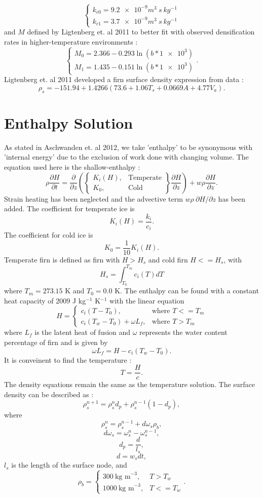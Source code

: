 \documentclass{article}%
\begin{document}
  $$
  \begin{cases}
    k_{c0} = \SI{9.2e-9} m^3\ s\ kg^{-1} \\
    k_{c1} = \SI{3.7e-9} m^3\ s\ kg^{-1}  
  \end{cases}
  $$
and $M$ defined by Ligtenberg et. al 2011 to better fit with observed densification rates in higher-temperature environments :
  $$
  \begin{cases}
    M_0 = 2.366 - 0.293\ln(b*\SI{1e3})\\
    M_1 = 1.435 - 0.151\ln(b*\SI{1e3})
  \end{cases}.
  $$
Ligtenberg et. al 2011 developed a firn surface density expression from data :
  $$ \rho_s = -151.94 + 1.4266(73.6 + 1.06T_s + 0.0669A + 4.77V_a).$$


\section{Enthalpy Solution}

As stated in Aschwanden et. al 2012, we take 'enthalpy' to be synonymous with 'internal energy' due to the exclusion of work done with changing volume.  The equation used here is the shallow-enthalpy :
	$$
  \rho \frac{\partial H}{\partial t} = \frac{\partial}{\partial z} 
    \left( 
      \begin{Bmatrix}
        K_i(H), &\text{Temperate}\\
        K_0, &\text{Cold}
      \end{Bmatrix}
      \frac{\partial H}{\partial z} 
    \right) + w \rho \frac{\partial H}{\partial z}.
  $$
Strain heating has been neglected and the advective term $w \rho\ \partial H / \partial z$ has been added.  The coefficient for temperate ice is 
  $$K_i(H) = \frac{k_i}{c_i}.$$
The coefficient for cold ice is
  $$K_0 = \frac{1}{10}K_i(H).$$
Temperate firn is defined as firn with $H > H_s$ and cold firn $H <= H_s$, with
  $$H_s = \int_{T_0}^{T_m}{c_i(T)}dT$$ 
where $T_m = 273.15$ K and $T_0 = 0.0$ K.  The enthalpy can be found with a constant heat capacity of $2009$ J kg$^{-1}$ K$^{-1}$ with the linear equation
  $$
  H = 
  \begin{cases}
    c_i(T - T_0), &\text{where } T <= T_m\\
    c_i(T_w - T_0) + \omega L_f,  &\text{where } T > T_m
  \end{cases}
  $$
where $L_f$ is the latent heat of fusion and $\omega$ represents the water content percentage of firn and is given by
  $$\omega L_f = H - c_i(T_w - T_0).$$
It is conveinent to find the temperature :
  $$T = \frac{H}{c}.$$
The density equations remain the same as the temperature solution.
The surface density can be described as : 
  $$\rho_s^{n+1} = \rho_s^{n} d_p + \rho_s^{n-1} (1 - d_p),$$
where
  $$\rho_s^{n} = \rho_s^{n-1} + d\omega_s \rho_b,$$
  $$d\omega_s = \omega_s^{n} - \omega_s^{n-1},$$ 
  $$d_p = \frac{d}{l_s},$$
  $$d = w_sdt,$$
$l_s$ is the length of the surface node, and
  $$
  \rho_b = 
  \begin{cases}
    300\ \text{kg m}^{-3},  &T > T_w\\
    1000\ \text{kg m}^{-3}, &T <= T_w
  \end{cases}.
  $$
\end{document}
